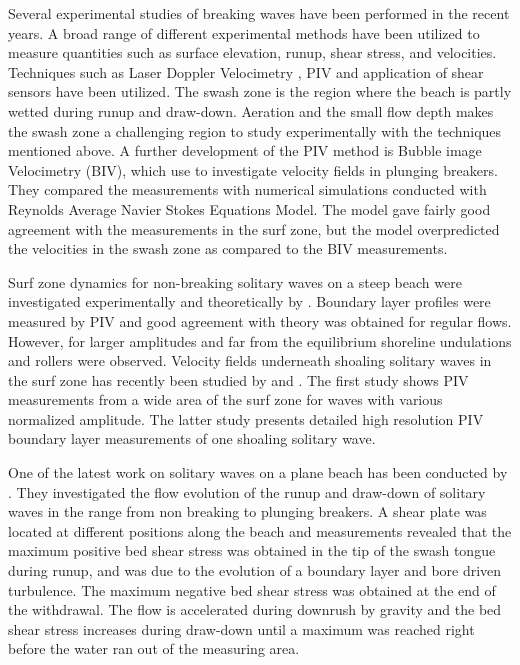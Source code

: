 \documentclass[review, authoryear]{elsarticle}
\begin{document}
 Several experimental studies of breaking waves have been performed in the recent years. A broad range of different experimental methods have been utilized to measure quantities such as surface elevation, runup, shear stress, and velocities. Techniques such as Laser Doppler Velocimetry \citep{petti01}, PIV \citep{cowen03} and application of shear sensors \citep{Barnes09}  have been utilized. The swash zone is  the region where the beach is partly wetted during runup and draw-down. Aeration and the 
small flow depth makes the swash zone a challenging region to study experimentally with the techniques mentioned above. A further development of the PIV method is Bubble image Velocimetry (BIV), which \cite{rivillas2012estimation} use to investigate velocity fields in plunging breakers. They compared the measurements with numerical simulations conducted with Reynolds Average Navier Stokes Equations Model. The   model gave fairly good agreement with the measurements in the surf zone, but the model overpredicted the velocities in the swash zone as compared to the BIV measurements.

Surf zone dynamics for non-breaking solitary waves on a steep beach were investigated experimentally and theoretically by \cite{pedersen2013runup}. Boundary layer profiles were measured by PIV and good agreement with theory was obtained for regular flows. However, for larger amplitudes and far from the equilibrium shoreline
undulations and rollers were observed.
Velocity fields underneath shoaling solitary waves in the surf zone has recently been studied by \cite{lin2014prebreaking} and \cite{lin2015study}. The first study shows PIV measurements from a wide area of the surf zone for waves with various normalized amplitude. The latter study presents detailed high resolution PIV boundary layer measurements of one shoaling solitary wave. 

One of the latest work on solitary waves on a plane beach has been conducted by \cite{pujara2015experimental}. They investigated the flow evolution of the runup and draw-down of solitary waves in the range from non breaking to plunging breakers. A shear plate was located at different positions along the beach and measurements revealed that the maximum positive bed shear stress was obtained in the tip of the swash tongue during runup,  and was due to the evolution of a boundary layer and  bore driven turbulence. The maximum negative bed shear stress was obtained at the end of the withdrawal. The flow is accelerated during downrush by gravity and the bed shear stress increases during draw-down until a maximum was reached right before the water ran out of the measuring area. 
\end{document}
